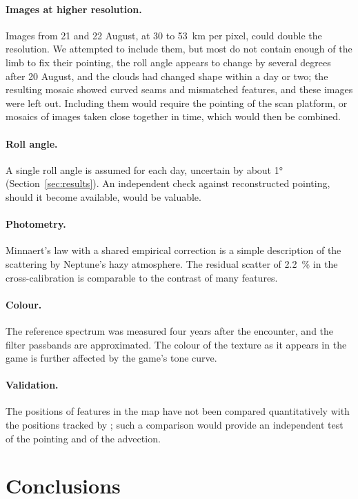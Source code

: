 \documentclass[11pt,a4paper]{article}
\begin{document}
\paragraph{Images at higher resolution.} Images from 21 and 22 August, at 30 to 53~km per pixel,
could double the resolution. We attempted to include them, but most do not contain enough of the
limb to fix their pointing, the roll angle appears to change by several degrees after 20 August,
and the clouds had changed shape within a day or two; the resulting mosaic showed curved seams and
mismatched features, and these images were left out. Including them would require the pointing of
the scan platform, or mosaics of images taken close together in time, which would then be combined.

\paragraph{Roll angle.} A single roll angle is assumed for each day, uncertain by about \ang{1}
(Section~\ref{sec:results}). An independent check against reconstructed pointing, should it
become available, would be valuable.

\paragraph{Photometry.} Minnaert's law with a shared empirical correction is a simple description
of the scattering by Neptune's hazy atmosphere. The residual scatter of \SI{2.2}{\percent} in the
cross-calibration is comparable to the contrast of many features.

\paragraph{Colour.} The reference spectrum was measured four years after the encounter, and the
filter passbands are approximated. The colour of the texture as it appears in the game is further
affected by the game's tone curve.

\paragraph{Validation.} The positions of features in the map have not been compared quantitatively
with the positions tracked by \citet{sromovsky1993}; such a comparison would provide an
independent test of the pointing and of the advection.

\section{Conclusions}\label{sec:conclusions}
\end{document}
